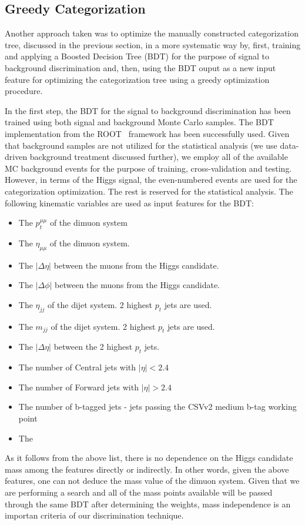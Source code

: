 \subsection{Greedy Categorization} \label{bdt_training}
Another approach taken was to optimize the manually constructed categorization tree, discussed in the previous section, in a more systematic way by, first, training and applying a Boosted Decision Tree (BDT) for the purpose of signal to background discrimination and, then, using the BDT ouput as a new input feature for optimizing the categorization tree using a greedy optimization procedure.

In the first step, the BDT for the signal to background discrimination has been trained using both signal and background Monte Carlo samples. The BDT implementation from the {\sc ROOT}~\cite{ROOT} framework has been successfully used. Given that background samples are not utilized for the statistical analysis (we use data-driven background treatment discussed further), we employ all of the available MC background events for the purpose of training, cross-validation and testing. However, in terms of the Higgs signal, the even-numbered events are used for the categorization optimization. The rest is reserved for the statistical analysis. The following kinematic variables are used as input features for the BDT:
\begin{itemize}
  \item The $p_t^{\mu\mu}$ of the dimuon system
  \item The $\eta_{\mu\mu}$ of the dimuon system.
  \item The $|\Delta \eta|$ between the muons from the Higgs candidate.
  \item The $|\Delta \phi|$ between the muons from the Higgs candidate.
  \item The $\eta_{jj}$ of the dijet system. 2 highest $p_t$ jets are used.
  \item The $m_{jj}$ of the dijet system. 2 highest $p_t$ jets are used.
  \item The $|\Delta \eta|$ between the 2 highest $p_t$ jets.
  \item The number of Central jets with $|\eta| < 2.4$
  \item The number of Forward jets with $|\eta| > 2.4$
  \item The number of b-tagged jets - jets passing the CSVv2 medium b-tag working point
  \item The \MET
\end{itemize}
As it follows from the above list, there is no dependence on the Higgs candidate mass among the features directly or indirectly. In other words, given the above features, one can not deduce the mass value of the dimuon system. Given that we are performing a search and all of the mass points available will be passed through the same BDT after determining the weights, mass independence is an importan criteria of our discrimination technique.

